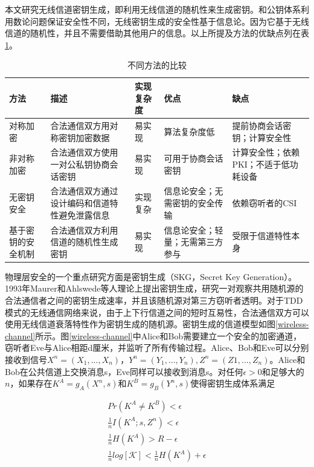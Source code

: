 \documentclass[master]{seuthesis} %
\begin{document}
\begin{Main}
本文研究无线信道密钥生成，即利用无线信道的随机性来生成密钥。和公钥体系利用数论问题保证安全性不同，无线密钥生成的安全性基于信息论。因为它基于无线信道的随机性\cite{ahlswede1993common}\cite{maurer1993secret}，并且不需要借助其他用户的信息。以上所提及方法的优缺点列在表\ref{comparison-different-schemes}。

\begin{table}[]
    \centering
    \begin{tabular}{|p{80pt}|p{90pt}|p{70pt}|p{90pt}|p{90pt}|}
    \hline
    方法 & 描述 & 实现复杂度 & 优点 & 缺点 \\ \hline
    对称加密 & 合法通信双方用对称密钥加密数据 & 易实现 & 算法复杂度低 & 提前协商会话密钥；计算安全性 \\ \hline
    非对称加密 & 合法通信双方使用一对公私钥协商会话密钥 & 易实现 & 可用于协商会话密钥 & 计算安全性；依赖PKI；不适于低功耗设备 \\ \hline
    无密钥安全 & 合法通信双方通过设计编码和信道特性避免泄露信息 & 实现复杂 & 信息论安全；无需密钥的安全传输 & 依赖窃听者的CSI \\ \hline
    基于密钥的安全机制 & 合法通信双方利用信道的随机性生成密钥 & 易实现 & 信息论安全；轻量；无需第三方参与 & 受限于信道特性本身 \\ \hline
    \end{tabular}

    \caption{不同方法的比较
    \label{comparison-different-schemes}}
\end{table}

物理层安全的一个重点研究方面是密钥生成（SKG，Secret Key Generation）。1993年Maurer和Ahlswede等人理论上提出密钥生成\cite{ahlswede1993common}\cite{maurer1993secret}，研究一对观察共用随机源的合法通信者之间的密钥生成速率，并且该随机源对第三方窃听者透明。对于TDD模式的无线通信网络来说，由于上下行信道之间的短时互易性，合法通信双方可以使用无线信道衰落特性作为密钥生成的随机源。密钥生成的信道模型如图\ref{wireless-channel}所示。图\ref{wireless-channel}中Alice和Bob需要建立一个安全的加密通道，窃听者Eve与Alice相距d厘米，并监听了所有传输过程。Alice、Bob和Eve可以分别接收到信号$X^n = (X_1, ..., X_n)$，$Y^n = (Y_1, ..., Y_n), Z^n = (Z1, ..., Z_n)$。Alice和Bob在公共信道上交换消息s，Eve同样可以接收到消息s。对任何$\epsilon > 0$和足够大的$n$，如果存在$K^A = g_A(X^n, s)$和$K^B = g_B(Y^n, s)$使得密钥生成体系满足

\begin{eqnarray}
    Pr(K^A \neq K^B) < \epsilon \label{keyrate1} \\
    \frac{1}{n}I(K^A; s, Z^n) < \epsilon \label{keyrate2} \\
    \frac{1}{n}H(K^A) > R - \epsilon \label{keyrate3} \\
    \frac{1}{n}log[\mathcal{K}] < \frac{1}{n}H(K^A) + \epsilon \label{keyrate4}
\end{eqnarray}


\end{Main}
\end{document}
